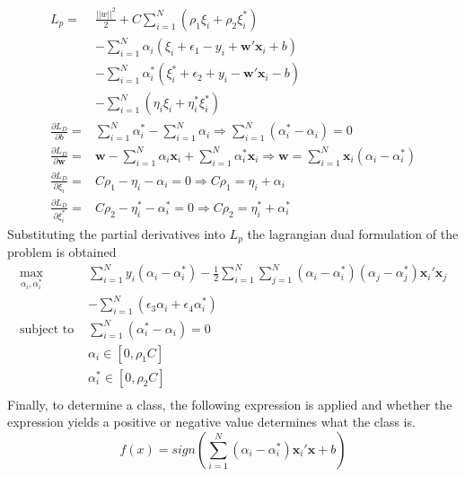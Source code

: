 \documentclass[twoside,11pt]{article}
\begin{document}
\[
\begin{array}{cc}
L_p=&\frac{||w||^2}{2}+C\displaystyle\sum_{i=1}^N(\rho_1\xi_i + \rho_2\xi_i^*) \\
& - \displaystyle\sum_{i=1}^N \alpha_i(\xi_i + \epsilon_1 - y_i + \mathbf{w}'\mathbf{x}_i + b)\\
& - \displaystyle\sum_{i=1}^N \alpha_i^*(\xi_i^* + \epsilon_2 + y_i - \mathbf{w}'\mathbf{x}_i - b)\\
&-\displaystyle\sum_{i=1}^N (\eta_i \xi_i + \eta_i^* \xi_i^*)\\
\frac{\partial L_D}{\partial b} = &\displaystyle\sum_{i=1}^N \alpha_i^*  - \displaystyle\sum_{i=1}^N \alpha_i \Rightarrow \displaystyle\sum_{i=1}^N (\alpha_i^* - \alpha_i) = 0 \\
\frac{\partial L_D}{\partial \mathbf{w}} = & \mathbf{w}-\displaystyle\sum_{i=1}^N \alpha_i \mathbf{x}_i+\displaystyle\sum_{i=1}^N \alpha_i^* \mathbf{x}_i \Rightarrow \mathbf{w} = \displaystyle\sum_{i=1}^N \mathbf{x}_i (\alpha_i - \alpha_i^*)\\
\frac{\partial L_D}{\partial \xi_i} = & C\rho_1 - \eta_i -\alpha_i = 0 \Rightarrow  C\rho_1 = \eta_i + \alpha_i \\
\frac{\partial L_D}{\partial \xi_i^*} = &C\rho_2 - \eta_i^* -\alpha_i^* = 0 \Rightarrow  C\rho_2 = \eta_i^* + \alpha_i^*
\end{array}
\]
Substituting the partial derivatives into $L_p$ the lagrangian dual formulation of the problem is obtained
\begin{equation} \label{Eq:QuantileSVMduala}
\begin{array}{cc}
\displaystyle\max_{\alpha_i, \alpha_i^*}& \displaystyle\sum_{i=1}^N y_i(\alpha_i - \alpha_i^*) - \frac{1}{2} \displaystyle\sum_{i=1}^N\displaystyle\sum_{j=1}^N (\alpha_i - \alpha_i^*)(\alpha_j - \alpha_j^*)\mathbf{x}_i' \mathbf{x}_j \\
&-\displaystyle\sum_{i=1}^N (\epsilon_3\alpha_i + \epsilon_4\alpha_i^*) \\
\text{subject to    } & \displaystyle\sum_{i=1}^N(\alpha_i^* - \alpha_i)=0 \\
& \alpha_i \in [0,\rho_1C] \\
& \alpha_i^* \in [0,\rho_2C] \\
\end{array}
\end{equation}
Finally, to determine a class, the following expression is applied and whether the expression yields a positive or negative value determines what the class is.
\begin{equation}\label{finalpredictioneqn1}
f(x)=sign(\displaystyle\sum_{i=1}^N (\alpha_i - \alpha_i^*)\mathbf{x}_i'\mathbf{x} +b)
\end{equation}
\end{document}
